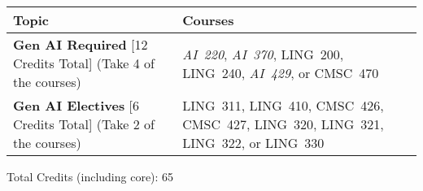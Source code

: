 \begin{longtable}{p{7cm}>{\raggedleft\arraybackslash}p{7cm}}
Topic & Courses \\
\toprule
\textbf{Gen AI Required} [12 Credits Total] (Take 4 of the courses) & \textit{AI~220}, \textit{AI~370}, LING~200, LING~240, \textit{AI~429}, or CMSC~470 \\
\textbf{Gen AI Electives} [6 Credits Total] (Take 2 of the courses) & LING~311, LING~410, CMSC~426, CMSC~427, LING~320, LING~321, LING~322, or LING~330 \\
\bottomrule
\end{longtable}
Total Credits (including core): 65
